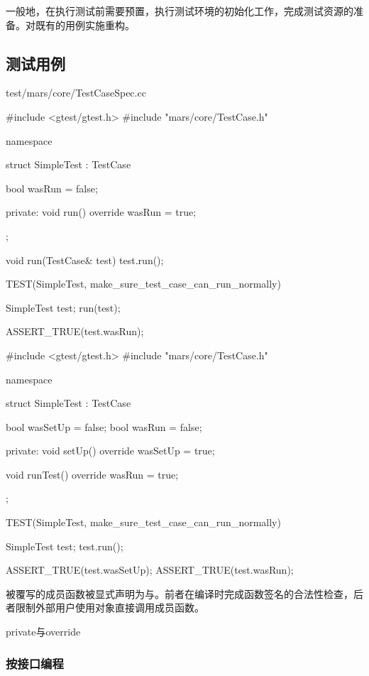 \begin{content}

一般地，在执行测试前需要预置，执行测试环境的初始化工作，完成测试资源的准备。对既有的用例实施重构。

\subsection{测试用例}

\begin{diff}{test/mars/core/TestCaseSpec.cc}
 \begin{minicpp}
#include <gtest/gtest.h>
#include "mars/core/TestCase.h"

namespace {
  struct SimpleTest : TestCase {
    bool wasRun = false;

  private:
    void run() override {
      wasRun = true;
    }
  };

  void run(TestCase& test) {
    test.run();
  }
}

TEST(SimpleTest, make_sure_test_case_can_run_normally) {
  SimpleTest test;
  run(test);

  ASSERT_TRUE(test.wasRun);
}
 \end{minicpp}
\tcblower
 \begin{minicpp}
#include <gtest/gtest.h>
#include "mars/core/TestCase.h"

namespace {
  struct SimpleTest : TestCase {
    bool wasSetUp = false;
    bool wasRun = false;

  private:
    void setUp() override {
      wasSetUp = true;
    }

    void runTest() override {
      wasRun = true;
    }
  };
}

TEST(SimpleTest, make_sure_test_case_can_run_normally) {
  SimpleTest test;
  test.run();

  ASSERT_TRUE(test.wasSetUp);
  ASSERT_TRUE(test.wasRun);
}
 \end{minicpp} 
\end{diff}


被覆写的成员函数被显式声明为与。前者在编译时完成函数签名的合法性检查，后者限制外部用户使用对象直接调用成员函数。

\begin{episode}{private与override}
\begin{content}

\subsubsection{按接口编程}


\end{content}
\end{episode}
\end{content}
